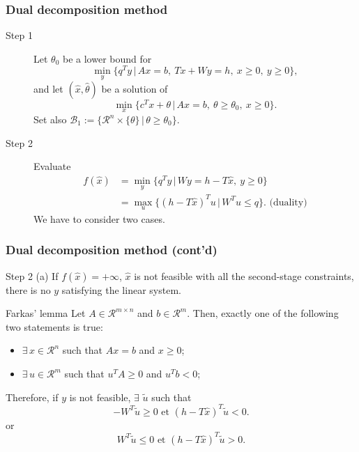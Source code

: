 \documentclass{beamer}
\def\rit{\mathcal{R}}
\begin{document}
\begin{frame}
\frametitle{Dual decomposition method}

\begin{description}
\item[\red Step 1]
Let $\theta_0$ be a lower bound for
\[
\min_y \lbrace q^Ty \,|\, Ax = b,\ Tx+Wy = h,\ x \geq 0,\ y \geq 0 \rbrace,
\]
and let $(\hat{x}, \hat{\theta})$ be a solution of
\[
\min_x \lbrace c^Tx + \theta \,|\, Ax = b,\ \theta \geq \theta_0,\ x
\geq 0 \rbrace.
\]
Set also $\mathcal{B}_1 := \lbrace \rit^n \times \lbrace \theta \rbrace
\,|\, \theta \geq \theta_0 \rbrace$.
\item[\red Step 2]
Evaluate
\begin{align*}
f(\hat{x}) &= \min_y \lbrace q^Ty \,|\, Wy = h-T\hat{x},\ y \geq 0
\rbrace \\
&= \max_u \lbrace (h-T\hat{x})^Tu \,|\, W^Tu \leq q \rbrace. \mbox{ (duality)}
\end{align*}
We have to consider two cases.
\end{description}
\end{frame}

\begin{frame}
\frametitle{Dual decomposition method (cont'd)}

{\red Step 2 (a)}
If $f(\hat{x}) = +\infty$, $\hat{x}$ is not feasible with all the second-stage constraints, there is no $y$ satisfying the linear system.

\mbox{}

\begin{block}{Farkas' lemma}
Let $A \in \rit^{m \times n}$ and $b \in \rit^m$.
Then, exactly one of the following two statements is true:
\begin{itemize}
\item
$\exists\, x \in \rit^n$ such that $Ax = b$ and $x \geq 0$;
\item
$\exists\, u \in \rit^m$ such that $u^T A \geq 0$ and $u^T b < 0$;
\end{itemize}
\end{block}
	
\mbox{}

Therefore, if $y$ is not feasible, $\exists$ $\tilde{u}$ such that
\[
-W^T\tilde{u} \geq 0 \mbox{ et } (h - T\hat{x})^T \tilde{u} < 0.
\]
or
\[
W^T\tilde{u} \leq 0 \mbox{ et } (h - T\hat{x})^T \tilde{u} > 0.
\]

\end{frame}
\end{document}
